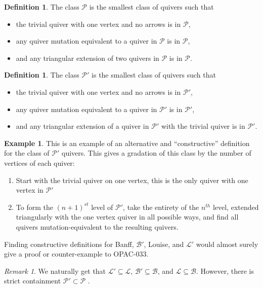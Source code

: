\documentclass[10pt]{amsart}
\theoremstyle{definition}
\newtheorem{defi}[thm]{Definition}
\newtheorem{exam}[thm]{Example}
\theoremstyle{remark}
\newtheorem{rema}[thm]{Remark}
\newcommand{\BB}{\mathcal{B}}
\newcommand{\PP}{\mathcal{P}}
\newcommand{\LL}{\mathcal{L}}
\begin{document}
 \begin{defi}\label{def-P}
    The class $\PP$ is the smallest class of quivers such that 
    \begin{itemize}
        \item the trivial quiver with one vertex and no arrows is in $\PP$,
        \item any quiver mutation equivalent to a quiver in $\PP$ is in $\PP$, 
        \item and any triangular extension of two quivers in $\PP$ is in $\PP$.
    \end{itemize}
 \end{defi}

 \begin{defi}\label{def-Pprime}
    The class $\PP'$ is the smallest class of quivers such that 
    \begin{itemize}
        \item the trivial quiver with one vertex and no arrows is in $\PP'$,
        \item any quiver mutation equivalent to a quiver in $\PP'$ is in $\PP'$, 
        \item and any triangular extension of a quiver in $\PP'$ with the trivial quiver is in $\PP'$.
    \end{itemize}
 \end{defi}


\begin{exam}\label{exa-constructive}
    This is an example of an alternative and ``constructive'' definition for the class of $\PP'$ quivers. This gives a gradation of this class by the number of vertices of each quiver:
    \begin{enumerate}
        \item Start with the trivial quiver on one vertex, this is the only quiver with one vertex in $\PP'$
        \item To form the $(n+1)^{st}$ level of $\PP'$, take the entirety of the $n^{th}$ level, extended triangularly with the one vertex quiver in all possible ways, and find all quivers mutation-equivalent to the resulting quivers.
    \end{enumerate}
    Finding constructive definitions for Banff, $\BB'$, Louise, and $\LL'$ would almost surely give a proof or counter-example to OPAC-033.
\end{exam}


\begin{rema} \label{rmk-subclasses}
    We naturally get that $\LL' \subseteq \LL$, $\BB' \subseteq \BB$, and $\LL \subseteq \BB$.
    However, there is strict containment $\PP' \subset \PP$ \cite[Remark 4.21]{ladkani_cluster_2013}.
\end{rema}
\end{document}
